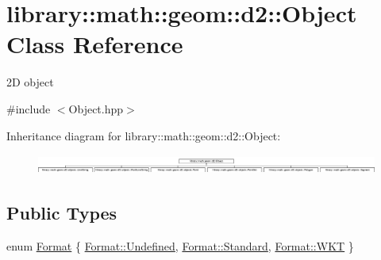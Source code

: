 \hypertarget{classlibrary_1_1math_1_1geom_1_1d2_1_1_object}{}\section{library\+:\+:math\+:\+:geom\+:\+:d2\+:\+:Object Class Reference}
\label{classlibrary_1_1math_1_1geom_1_1d2_1_1_object}


2D object  




{\ttfamily \#include $<$Object.\+hpp$>$}

Inheritance diagram for library\+:\+:math\+:\+:geom\+:\+:d2\+:\+:Object\+:\begin{figure}[H]
\begin{center}
\leavevmode
\includegraphics[height=0.664294cm]{classlibrary_1_1math_1_1geom_1_1d2_1_1_object}
\end{center}
\end{figure}
\subsection*{Public Types}
\begin{DoxyCompactItemize}
\item 
enum \hyperlink{classlibrary_1_1math_1_1geom_1_1d2_1_1_object_ac8cd61dada4960cfee9a469231621b17}{Format} \{ \hyperlink{classlibrary_1_1math_1_1geom_1_1d2_1_1_object_ac8cd61dada4960cfee9a469231621b17aec0fc0100c4fc1ce4eea230c3dc10360}{Format\+::\+Undefined}, 
\hyperlink{classlibrary_1_1math_1_1geom_1_1d2_1_1_object_ac8cd61dada4960cfee9a469231621b17aeb6d8ae6f20283755b339c0dc273988b}{Format\+::\+Standard}, 
\hyperlink{classlibrary_1_1math_1_1geom_1_1d2_1_1_object_ac8cd61dada4960cfee9a469231621b17a9ab05752e6beff2c783a6046ed592661}{Format\+::\+W\+KT}
 \}
\end{DoxyCompactItemize}
